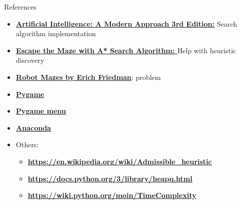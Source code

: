\begin{frame}{References}
    \begin{itemize}
        \item \textbf{\href{https://moodle.up.pt/pluginfile.php/196597/mod_resource/content/0/ArtificialIntelligence_ModernApproach_3rdEdition.pdf}{Artificial Intelligence: A Modern Approach 3rd Edition:}} Search algorithm implementation
        \item \textbf{\href{https://towardsdatascience.com/escape-the-maze-with-a-search-algorithm-bb0f1cf876e0}{Escape the Maze with A* Search Algorithm: }} Help with heuristic discovery
        \item \textbf{\href{https://erich-friedman.github.io/puzzle/robot/}{Robot Mazes by Erich Friedman}}: problem
        \item \textbf{\href{https://www.pygame.org/docs/}{Pygame}}
        \item \textbf{\href{https://pygame-menu.readthedocs.io/en/4.2.7/}{Pygame menu}}
        \item \textbf{\href{https://www.anaconda.com/}{Anaconda}}
        \item Others:
        \begin{itemize}
            \item \textbf{\href{https://en.wikipedia.org/wiki/Admissible_heuristic}{https://en.wikipedia.org/wiki/Admissible\_heuristic}}
            \item \textbf{\href{https://docs.python.org/3/library/heapq.html}{https://docs.python.org/3/library/heapq.html}}
            \item \textbf{\href{https://wiki.python.org/moin/TimeComplexity}{https://wiki.python.org/moin/TimeComplexity}}
        \end{itemize}
    \end{itemize}
\end{frame}